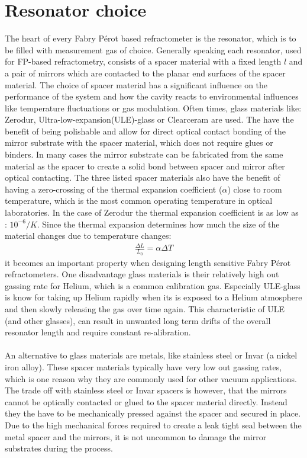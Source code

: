 \section{Resonator choice}
The heart of every Fabry Pérot based refractometer is the resonator, which is to be filled with measurement gas of choice. Generally speaking each resonator, used for FP-based refractometry, consists of a spacer material with a fixed length $l$ and a pair of mirrors which are contacted to the planar end surfaces of the spacer material. The choice of spacer material has a significant influence on the performance of the system and how the cavity reacts to environmental influences like temperature fluctuations or gas modulation. Often times, glass materials like: Zerodur, Ultra-low-expansion(ULE)-glass or Clearceram are used. The have the benefit of being polishable and allow for direct optical contact bonding of the mirror substrate with the spacer material, which does not require glues or binders. In many cases the mirror substrate can be fabricated from the same material as the spacer to create a solid bond between spacer and mirror after optical contacting. The three listed spacer materials also have the benefit of having a zero-crossing of the thermal expansion coefficient ($\alpha$) close to room temperature, which is the most common operating temperature in optical laboratories. In the case of Zerodur the thermal expansion coefficient is as low as : $10^{-6}/K$. Since the thermal expansion determines how much the size of the material changes due to temperature changes:
\begin{align}
	\frac{\Delta L}{L_0} = \alpha \Delta T
\end{align}
it becomes an important property when designing length sensitive Fabry Pérot refractometers. One disadvantage glass materials is their relatively high out gassing rate for Helium, which is a common calibration gas. Especially ULE-glass is know for taking up Helium rapidly when its is exposed to a Helium atmosphere and then slowly releasing the gas over time again. This characteristic of ULE (and other glasses), can result in unwanted long term drifts of the overall resonator length and require constant re-alibration.\\\\
An alternative to glass materials are metals, like stainless steel or Invar (a nickel iron alloy). These spacer materials typically have very low out gassing rates, which is one reason why they are commonly used for other vacuum applications. The trade off with stainless steel or Invar spacers is however, that the mirrors cannot be optically contacted or glued to the spacer material directly. Instead they the have to be mechanically pressed against the spacer and secured in place. Due to the high mechanical forces required to create a leak tight seal between the metal spacer and the mirrors, it is not uncommon to damage the mirror substrates during the process.\\\\
